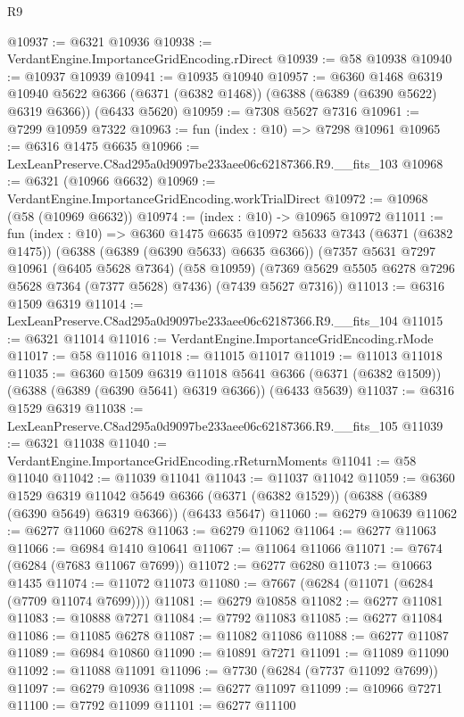 \begin{lexlean}{R9}
\begin{coremodule}
@10937 := @6321 @10936
@10938 := VerdantEngine.ImportanceGridEncoding.rDirect
@10939 := @58 @10938
@10940 := @10937 @10939
@10941 := @10935 @10940
@10957 := @6360
    @1468
    @6319
    @10940
    @5622
    @6366
    (@6371 (@6382 @1468))
    (@6388 (@6389 (@6390 @5622) @6319 @6366))
    (@6433 @5620)
@10959 := @7308 @5627 @7316
@10961 := @7299 @10959 @7322
@10963 := fun (index : @10) => @7298 @10961
@10965 := @6316 @1475 @6635
@10966 := LexLeanPreserve.C8ad295a0d9097be233aee06c62187366.R9.__fits_103
@10968 := @6321 (@10966 @6632)
@10969 := VerdantEngine.ImportanceGridEncoding.workTrialDirect
@10972 := @10968 (@58 (@10969 @6632))
@10974 := (index : @10) -> @10965 @10972
@11011 := fun (index : @10) =>
  @6360
    @1475
    @6635
    @10972
    @5633
    @7343
    (@6371 (@6382 @1475))
    (@6388 (@6389 (@6390 @5633) @6635 @6366))
    (@7357
      @5631
      @7297
      @10961
      (@6405 @5628 @7364)
      (@58 @10959)
      (@7369 @5629 @5505 @6278 @7296 @5628 @7364 (@7377 @5628) @7436)
      (@7439 @5627 @7316))
@11013 := @6316 @1509 @6319
@11014 := LexLeanPreserve.C8ad295a0d9097be233aee06c62187366.R9.__fits_104
@11015 := @6321 @11014
@11016 := VerdantEngine.ImportanceGridEncoding.rMode
@11017 := @58 @11016
@11018 := @11015 @11017
@11019 := @11013 @11018
@11035 := @6360
    @1509
    @6319
    @11018
    @5641
    @6366
    (@6371 (@6382 @1509))
    (@6388 (@6389 (@6390 @5641) @6319 @6366))
    (@6433 @5639)
@11037 := @6316 @1529 @6319
@11038 := LexLeanPreserve.C8ad295a0d9097be233aee06c62187366.R9.__fits_105
@11039 := @6321 @11038
@11040 := VerdantEngine.ImportanceGridEncoding.rReturnMoments
@11041 := @58 @11040
@11042 := @11039 @11041
@11043 := @11037 @11042
@11059 := @6360
    @1529
    @6319
    @11042
    @5649
    @6366
    (@6371 (@6382 @1529))
    (@6388 (@6389 (@6390 @5649) @6319 @6366))
    (@6433 @5647)
@11060 := @6279 @10639
@11062 := @6277 @11060 @6278
@11063 := @6279 @11062
@11064 := @6277 @11063
@11066 := @6984 @1410 @10641
@11067 := @11064 @11066
@11071 := @7674 (@6284 (@7683 @11067 @7699))
@11072 := @6277 @6280
@11073 := @10663 @1435
@11074 := @11072 @11073
@11080 := @7667 (@6284 (@11071 (@6284 (@7709 @11074 @7699))))
@11081 := @6279 @10858
@11082 := @6277 @11081
@11083 := @10888 @7271
@11084 := @7792 @11083
@11085 := @6277 @11084
@11086 := @11085 @6278
@11087 := @11082 @11086
@11088 := @6277 @11087
@11089 := @6984 @10860
@11090 := @10891 @7271
@11091 := @11089 @11090
@11092 := @11088 @11091
@11096 := @7730 (@6284 (@7737 @11092 @7699))
@11097 := @6279 @10936
@11098 := @6277 @11097
@11099 := @10966 @7271
@11100 := @7792 @11099
@11101 := @6277 @11100

\end{coremodule}
\end{lexlean}
